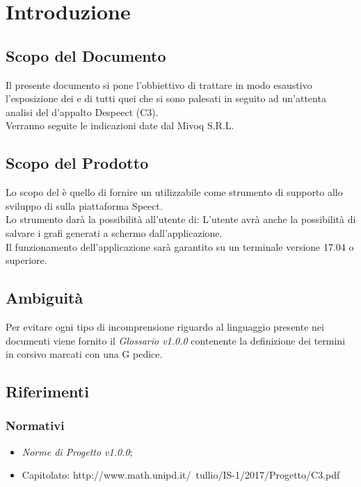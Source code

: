 \documentclass[./AnalisideiRequisiti.tex]{subfiles}
\begin{document}
	
\chapter{Introduzione}
\section{Scopo del Documento}
Il presente documento si pone l’obbiettivo di trattare in modo esaustivo l’esposizione dei  e di tutti quei  che si sono palesati in seguito ad un’attenta analisi del  d’appalto Despeect (C3).
\\ \noindent Verranno seguite le indicazioni date dal  Mivoq S.R.L.

\section{Scopo del Prodotto}

Lo scopo del  è quello di fornire un  utilizzabile come strumento di supporto allo sviluppo di  sulla piattaforma Speect. 
\\ \noindent Lo strumento darà la possibilità all'utente di:
L'utente avrà anche la possibilità di salvare i grafi generati a schermo dall'applicazione.
\\ \noindent Il funzionamento dell'applicazione sarà garantito su un terminale  versione 17.04 o superiore.

\section{Ambiguità}
Per evitare ogni tipo di incomprensione riguardo al linguaggio presente nei documenti viene fornito il \textit{Glossario v1.0.0} contenente la definizione dei termini in corsivo marcati con una G pedice.

\section{Riferimenti}
\subsection{Normativi}
\begin{itemize}
	\item \textit{Norme di Progetto v1.0.0};
	\item Capitolato: http://www.math.unipd.it/~tullio/IS-1/2017/Progetto/C3.pdf
\end{itemize}
\end{document}
